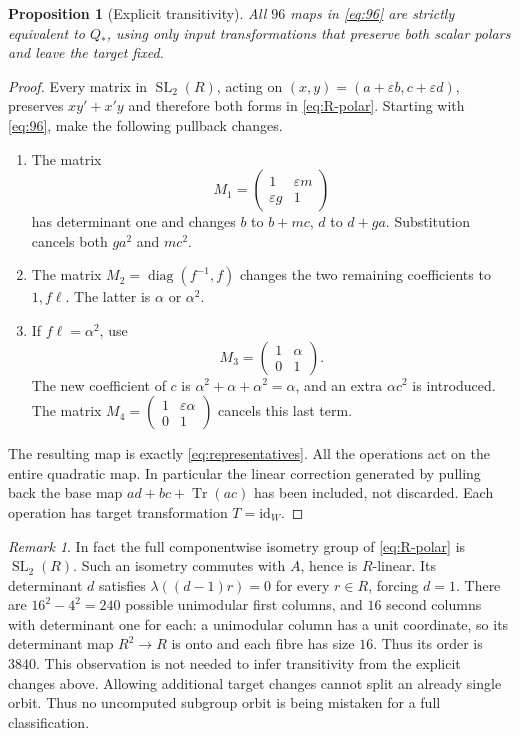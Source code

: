 \documentclass[11pt,a4paper]{article}
\newtheorem{proposition}[theorem]{Proposition}
\theoremstyle{definition}
\theoremstyle{remark}
\newtheorem{remark}[theorem]{Remark}
\numberwithin{equation}{section}
\newcommand{\Tr}{\operatorname{Tr}}
\newcommand{\SL}{\operatorname{SL}}
\newcommand{\Qstar}{Q_*}
\newcommand{\eps}{\varepsilon}
\newcommand{\id}{\mathrm{id}}
\begin{document}
\begin{proposition}[Explicit transitivity]\label{prop:orbit}
All \(96\) maps in \eqref{eq:96} are strictly equivalent to \(\Qstar\),
using only input transformations that preserve both scalar polars
and leave the target fixed.
\end{proposition}
\begin{proof}
Every matrix in \(\SL_2(R)\), acting on
\((x,y)=(a+\eps b,c+\eps d)\), preserves
\(xy'+x'y\) and therefore both forms in \eqref{eq:R-polar}.
Starting with \eqref{eq:96}, make the following pullback changes.
\begin{enumerate}[label=\arabic*.]
\item The matrix
\[
 M_1=\begin{pmatrix}1&\eps m\\ \eps g&1\end{pmatrix}
\]
has determinant one and changes \(b\) to \(b+mc\), \(d\) to \(d+ga\).
Substitution cancels both \(ga^2\) and \(mc^2\).
\item The matrix \(M_2=\operatorname{diag}(f^{-1},f)\) changes
the two remaining coefficients to \(1,f\ell\).
The latter is \(\alpha\) or \(\alpha^2\).
\item If \(f\ell=\alpha^2\), use
\[
 M_3=\begin{pmatrix}1&\alpha\\0&1\end{pmatrix}.
\]
The new coefficient of \(c\) is
\(\alpha^2+\alpha+\alpha^2=\alpha\), and an extra
\(\alpha c^2\) is introduced.
The matrix \(M_4=\begin{pmatrix}1&\eps\alpha\\0&1\end{pmatrix}\)
cancels this last term.
\end{enumerate}
The resulting map is exactly \eqref{eq:representatives}.
All the operations act on the entire quadratic map. In particular
the linear correction generated by pulling back the base map
\(ad+bc+\Tr(ac)\) has been included, not discarded.
Each operation has target transformation \(T=\id_W\).
\end{proof}

\begin{remark}\label{rem:isometry}
In fact the full componentwise isometry group of \eqref{eq:R-polar}
is \(\SL_2(R)\). Such an isometry commutes with \(A\), hence is
\(R\)-linear. Its determinant \(d\) satisfies
\(\lambda((d-1)r)=0\) for every \(r\in R\), forcing \(d=1\).
There are \(16^2-4^2=240\) possible unimodular first columns, and
\(16\) second columns with determinant one for each: a unimodular
column has a unit coordinate, so its determinant map \(R^2\to R\)
is onto and each fibre has size \(16\). Thus its order is
\(3840\). This observation is not needed to infer transitivity from
the explicit changes above. Allowing additional target changes cannot
split an already single orbit. Thus no uncomputed subgroup orbit is
being mistaken for a full classification.
\end{remark}
\end{document}
